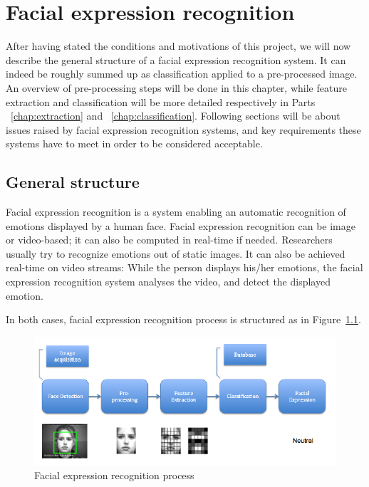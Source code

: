 \chapter{Facial expression recognition}

\noindent After having stated the conditions and motivations of this project, we will now describe the general structure of a facial expression recognition system. It can indeed be roughly summed up as classification applied to a pre-processed image. An overview of pre-processing steps will be done in this chapter, while feature extraction and classification will be more detailed respectively in Parts ~\ref{chap:extraction} and ~\ref{chap:classification}. Following sections will be about issues raised by facial expression recognition systems, and key requirements these systems have to meet in order to be considered acceptable.

\section{General structure}

\vspace{\baselineskip}
\noindent Facial expression recognition is a system enabling an automatic recognition of emotions displayed by a human face. Facial expression recognition can be image or video-based; it can also be computed in real-time if needed. Researchers usually try to recognize emotions out of static images. It can also be achieved real-time on video streams: While the person displays his/her emotions, the facial expression recognition system analyses the video, and detect the displayed emotion.
\newline

\noindent In both cases, facial expression recognition process is structured as in Figure~\ref{facial_expression_recognition_process}.
\newline

\begin{figure}[!h]
\begin{center}
\noindent \includegraphics[scale=0.6]{figures/facial_expression_recognition_process} 
\newline
\caption{Facial expression recognition process}
\label{facial_expression_recognition_process}
\end{center} 
\end{figure}

